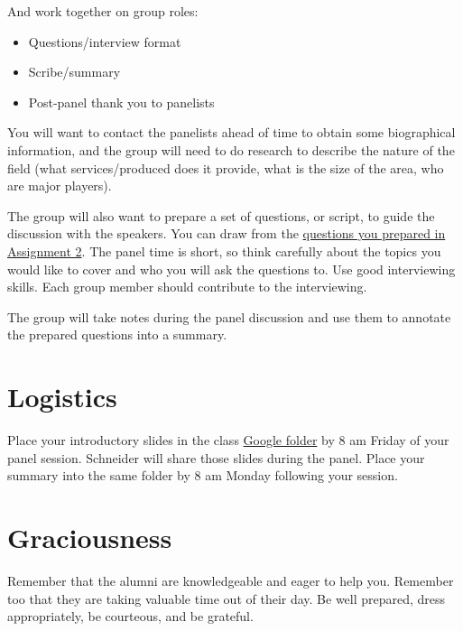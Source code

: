 \documentclass[11pt]{article}
\begin{document}
And work together on group roles:
\begin{itemize}
\item Questions/interview format
\item Scribe/summary
\item Post-panel thank you to panelists
\end{itemize}

You will want to contact the panelists ahead of time to obtain some biographical information, and the group will need to do research to describe the nature of the field (what services/produced does it provide, what is the size of the area, who are major players).

The group will also want to prepare a set of questions, or script, to guide the discussion with the speakers. You can draw from the \href{https://docs.google.com/document/d/1eUqnfeW1NTqqTqEzBxjCo6u20dFwN1kRAMNXPG9ioL0/edit?usp=sharing}{questions you prepared in Assignment 2}. The panel time is short, so think carefully about the topics you would like to cover and who you will ask the questions to. Use good interviewing skills. Each group member should  contribute to the interviewing. 

The group will take notes during the panel discussion and use them to annotate the prepared questions into a summary.

\section{Logistics}
\label{sec:orgc46866a}
Place your introductory slides in the class \href{https://drive.google.com/drive/folders/1tC6bTIxFh\_fRfUk-FdwIHLAv8rMCMje3?usp=sharing}{Google folder} by 8 am Friday of your panel session. Schneider will share those slides during the panel. Place your summary into the same folder by 8 am Monday following your session. 

\section{Graciousness}
\label{sec:org4d716fa}
Remember that the alumni are knowledgeable and eager to help you. Remember too that they are taking valuable time out of their day. Be well prepared, dress appropriately, be courteous, and be grateful. 
\end{document}
